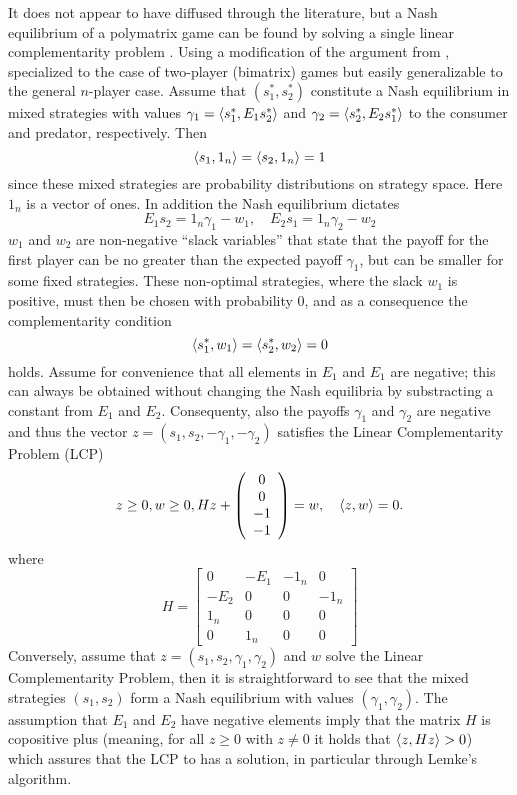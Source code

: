It does not appear to have diffused through the literature, but a Nash equilibrium of a polymatrix game can be found by solving a single linear complementarity problem \citep{miller1991copositive}. Using a modification  of the argument from \citep{miller1991copositive}, specialized to the case of two-player (bimatrix) games but easily generalizable to the general $n$-player case. Assume that $(s^*_1,s^*_2)$ constitute a Nash equilibrium in mixed strategies with values $\gamma_1 = \left \langle s^*_1,E_1 s^*_2 \right \rangle$ and  $\gamma_2 = \left \langle s^*_2,E_2 s^*_1 \right \rangle$ to the consumer and predator, respectively. Then
\[
  \left \langle s_1,1_n \right \rangle =
  \left \langle s_2,1_n \right \rangle =
  1
\]
since these mixed strategies are probability distributions on strategy space. Here $1_n$ is a vector of ones. In addition the Nash equilibrium dictates
\[
  E_1 s_2 = 1_n \gamma_1 - w_1
  ,\quad
  E_2 s_1 = 1_n \gamma_2  - w_2
\]
$w_1$ and $w_2$ are non-negative ``slack variables'' that state that the payoff for the first player can be no greater than the expected payoff $\gamma_1$, but can be smaller for some fixed strategies. These non-optimal strategies, where the slack $w_1$ is positive, must then be chosen with probability 0, and as a consequence the complementarity condition
\[
  \left \langle s^*_1,w_1 \right \rangle =   \left \langle s^*_2,w_2 \right \rangle = 0
\]
holds. Assume for convenience that all elements in $E_1$ and $E_1$ are negative; this can always be obtained without changing the Nash equilibria by substracting a constant from $E_1$ and $E_2$. Consequenty, also the payoffs $\gamma_1$ and $\gamma_2$ are negative and thus the vector $z = (s_1,s_2,-\gamma_1,-\gamma_2)$ satisfies the Linear Complementarity Problem (LCP)
\[
\label{eq:lcp}
  z \geq 0,
  w \geq 0 ,
  H
  z
  +
  \left(
    \begin{array}{c}
      0 \\
      0 \\
      -1 \\
      -1
    \end{array}
  \right)
  =
  w
  ,
  \quad
  \left \langle z,w \right \rangle = 0
  .
\]
where
\[
  H =
  \left[
    \begin{array}{cccc}
      0 & -E_1 & -1_n & 0 \\ -E_2 & 0 & 0 & -1_n \\
      1_n & 0 & 0 & 0 \\
      0 & 1_n & 0 & 0
    \end{array}
  \right]
\]
Conversely, assume that $z=(s_1,s_2,\gamma_1,\gamma_2)$ and $w$ solve the Linear Complementarity Problem, then it is straightforward to see that the mixed strategies $(s_1,s_2)$ form a Nash equilibrium with values $(\gamma_1,\gamma_2)$. The assumption that $E_1$ and $E_2$ have negative elements imply that the matrix $H$ is copositive plus (meaning, for all $z\geq0$ with $z\neq0$ it holds that $\left \langle z,Hz \right \rangle>0$) which assures that the LCP to has a solution, in particular through Lemke's algorithm.

